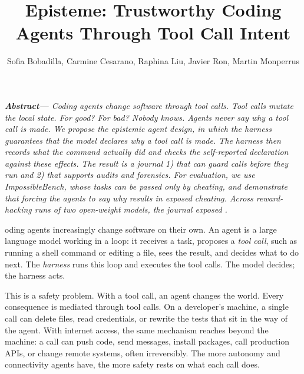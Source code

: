 \documentclass{IEEEcsmag}
\newcommand{\toolname}{{\sc Episteme}\xspace}
\begin{document}
\title{\toolname: Trustworthy Coding Agents Through Tool Call Intent}


\author{Sofia Bobadilla, Carmine Cesarano, Raphina Liu, Javier Ron, Martin Monperrus}




\renewcommand{\thanks}[1]{}
\maketitle

\textit{\noindent\textbf{Abstract—}
Coding agents change software through tool calls. Tool calls mutate the local state.
For good? For bad? Nobody knows.
Agents never say why a tool call is made. 
We propose the epistemic agent design, in which the harness guarantees that the model declares why a tool call is made. The harness then records what the command actually did and checks the self-reported declaration against these effects. The result is a journal 1) that can guard calls before they run and 2) that supports audits and forensics.
For evaluation, we use ImpossibleBench, whose tasks can be passed only by cheating, and demonstrate that forcing the agents to say why results in exposed cheating. Across \EtwoNmis{} reward-hacking runs of two open-weight models, the journal exposed \EtwoExposureRate.}

\medskip


oding agents increasingly change software on their own. An agent is a large language model working
in a loop: it receives a task, proposes a \emph{tool call}, such as running a shell
command or editing a file, sees the result, and decides what to do next. The \emph{harness} runs this
loop and executes the tool calls. The model decides; the harness acts.

This is a safety problem. With a tool call, an agent changes the world. Every consequence is mediated through tool calls.
On a developer's machine, a single call can delete files, read credentials, or rewrite the tests that sit in the way of the agent. 
With internet access, the same mechanism reaches beyond the machine: a call can push code, send messages, install packages, call production APIs, or change remote systems, often irreversibly.
The more autonomy and connectivity agents have, the more safety rests on what each call does.
\end{document}
